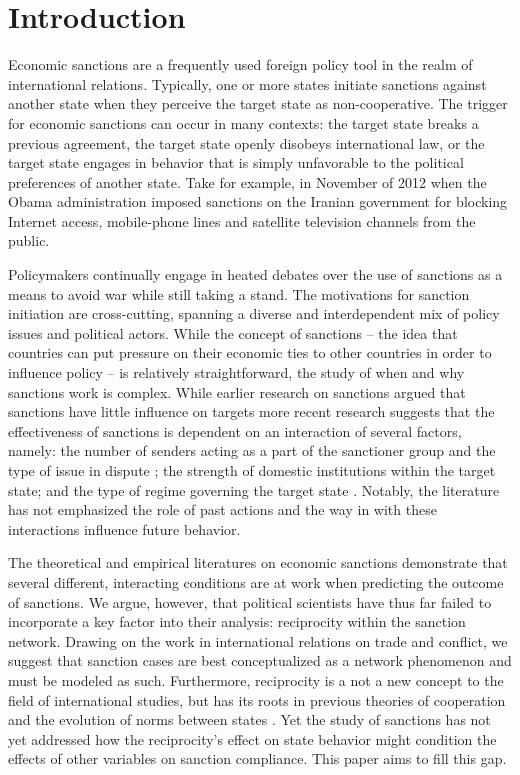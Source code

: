 \section*{Introduction}
\label{intro}

Economic sanctions are a frequently used foreign policy tool in the realm of international relations. Typically, one or more states initiate sanctions against another state when they perceive the target state as non-cooperative. The trigger for economic sanctions can occur in many contexts: the target state breaks a previous agreement, the target state openly disobeys international law, or the target state engages in behavior that is simply unfavorable to the political preferences of another state. Take for example, in November of 2012 when the Obama administration imposed sanctions on the Iranian government for blocking Internet access, mobile-phone lines and satellite television channels from the public. 

Policymakers continually engage in heated debates over the use of sanctions as a means to avoid war while still taking a stand. The motivations for sanction initiation are cross-cutting, spanning a diverse and interdependent mix of policy issues and political actors. While the concept of sanctions -- the idea that countries can put pressure on their economic ties to other countries in order to influence policy -- is relatively straightforward, the study of when and why sanctions work is complex. While earlier research on sanctions argued that sanctions have little influence on targets \citep{lam1990, dashti1997, morgan1997, drezner1998} more recent research suggests that the effectiveness of sanctions is dependent on an interaction of several factors, namely: the number of senders acting as a part of the sanctioner group and the type of issue in dispute \citep{miers2002, morgan2009threat}; the strength of domestic institutions within the target state; and the type of regime governing the target state \citep{mcgillivray2004}. Notably, the literature has not emphasized the role of past actions and the way in with these interactions influence future behavior.

The theoretical and empirical literatures on economic sanctions demonstrate that several different, interacting conditions are at work when predicting the outcome of sanctions. We argue, however, that political scientists have thus far failed to incorporate a key factor into their analysis: reciprocity within the sanction network. Drawing on the work in international relations on trade and conflict, we suggest that sanction cases are best conceptualized as a network phenomenon and must be modeled as such. Furthermore, reciprocity is a not a new concept to the field of international studies, but has its roots in previous theories of cooperation and the evolution of norms between states \citep{keohane1989reciprocity,goldstein1991reciprocity,rajmaira1990evolving,ward1992reciprocity}. Yet the study of sanctions has not yet addressed how the reciprocity's effect on state behavior might condition the effects of 
other variables on sanction compliance. This paper aims to fill this gap.

